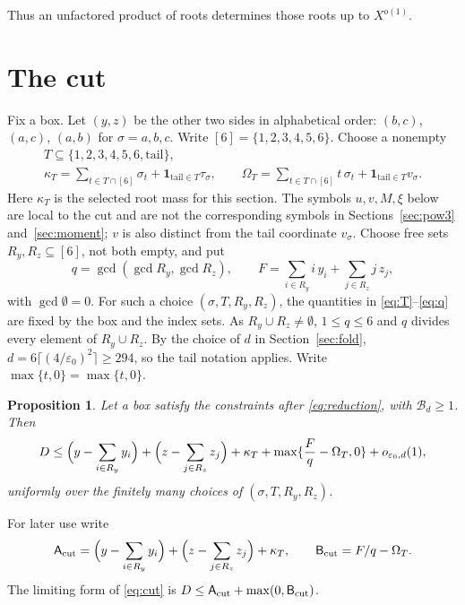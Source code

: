 \documentclass{amsart}
\newtheorem{proposition}[lemma]{Proposition}
\theoremstyle{definition}
\theoremstyle{plain}
\numberwithin{equation}{section}
\numberwithin{table}{section}
\newcommand{\pos}[1]{\max\{#1,0\}}
\begin{document}
Thus an unfactored product of roots determines those roots up to $X^{o(1)}$.

\section{The cut}\label{sec:cut}

Fix a box. Let $(y,z)$ be the other two sides in alphabetical order:
$(b,c)$, $(a,c)$, $(a,b)$ for $\sigma=a,b,c$. Write
$[6]=\{1,2,3,4,5,6\}$. Choose a nonempty
\begin{equation}\label{eq:T}
 \begin{gathered}
  T\subseteq\{1,2,3,4,5,6,\mathrm{tail}\},\\
  \kappa_T=\sum_{t\in T\cap[6]}\sigma_t+\mathbf 1_{\mathrm{tail}\in T}\tau_\sigma,
  \qquad
  \Omega_T=\sum_{t\in T\cap[6]}t\,\sigma_t+\mathbf 1_{\mathrm{tail}\in T}v_\sigma .
 \end{gathered}
\end{equation}
Here $\kappa_T$ is the selected root mass for this section. The symbols
$u,v,M,\xi$ below are local to the cut and are not the corresponding symbols
in Sections~\ref{sec:pow3} and~\ref{sec:moment}; $v$ is also distinct from
the tail coordinate $v_\sigma$.
Choose free sets $R_y,R_z\subseteq[6]$, not both empty, and put
\begin{equation}\label{eq:q}
 q=\gcd(\gcd R_y,\gcd R_z),
 \qquad
 F=\sum_{i\in R_y}i\,y_i+\sum_{j\in R_z}j\,z_j,
\end{equation}
with $\gcd\emptyset=0$. For such a choice
$(\sigma,T,R_y,R_z)$, the quantities in \eqref{eq:T}--\eqref{eq:q}
are fixed by the box and the index sets.
As $R_y\cup R_z\ne\emptyset$, $1\le q\le6$ and $q$ divides every element of
$R_y\cup R_z$. By the choice of $d$ in Section~\ref{sec:fold},
$d=6\lceil(4/\varepsilon_0)^2\rceil\ge294$,
so the tail notation applies. Write $\pos{t}=\max\{t,0\}$.

\begin{proposition}\label{prop:cut}
Let a box satisfy the constraints after \eqref{eq:reduction}, with
$\mathcal B_d\ge1$. Then
\begin{equation}\label{eq:cut}
 D\le\Bigl(y-\sum_{i\in R_y}y_i\Bigr)+\Bigl(z-\sum_{j\in R_z}z_j\Bigr)
  +\kappa_T+\pos{\frac Fq-\Omega_T}+o_{\varepsilon_0,d}(1),
\end{equation}
uniformly over the finitely many choices of $(\sigma,T,R_y,R_z)$.
\end{proposition}

For later use write
\[
  \mathsf A_{\rm cut}=\Bigl(y-\sum_{i\in R_y}y_i\Bigr)+\Bigl(z-\sum_{j\in R_z}z_j\Bigr)+\kappa_T,
  \qquad \mathsf B_{\rm cut}=F/q-\Omega_T.
\]
The limiting form of \eqref{eq:cut} is
$D\le\mathsf A_{\rm cut}+\max(0,\mathsf B_{\rm cut})$.
\end{document}
